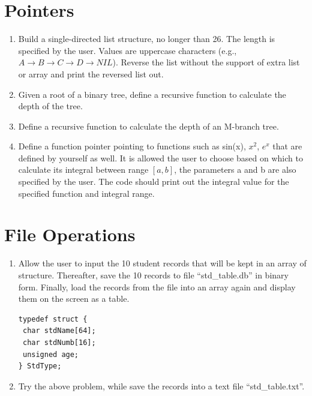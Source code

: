 \documentclass[11pt]{article}
\begin{document}
\section{Pointers}

\begin{enumerate}
    \item Build a single-directed list structure, no longer than 26. The length is specified by the user. Values are uppercase characters (e.g., $A{\rightarrow}B{\rightarrow}C{\rightarrow}D{\rightarrow}NIL$). Reverse the list without the support of extra list or array and print the reversed list out.
    \item Given a root of a binary tree, define a recursive function to calculate the depth of the tree.
    \item Define a recursive function to calculate the depth of an M-branch tree.
    \item Define a function pointer pointing to functions such as sin(x), $x^2$, $e^x$ that are defined by yourself as well. It is allowed the user to choose based on which to calculate its integral between range $[a, b]$, the parameters a and b are also specified by the user. The code should print out the integral value for the specified function and integral range.
\end{enumerate}

\section{File Operations}
\begin{enumerate}
	\item {Allow the user to input the 10 student records that will be kept in an array of structure. Thereafter, save the 10 records to file ``std\_table.db'' in binary form. Finally, load the records from the file into an array again and display them on the screen as a table.}
\begin{lstlisting}
typedef struct {
 char stdName[64];
 char stdNumb[16];
 unsigned age;
} StdType;
\end{lstlisting}
\vspace{-0.2in}
	\item {Try the above problem, while save the records into a text file ``std\_table.txt''.}
\end{enumerate}
\end{document}
